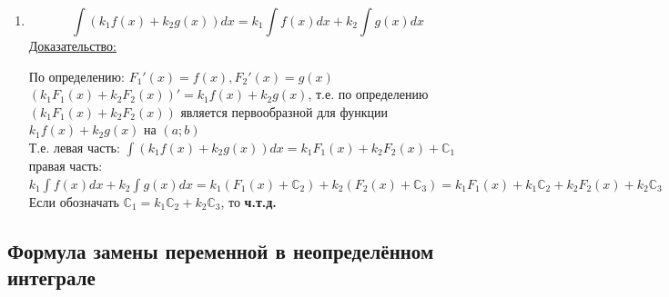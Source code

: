 \documentclass[12pt]{article}
\begin{document}
\begin{enumerate}
\begin{adjustwidth}{1.5em}{1.5em}
            левая часть: $\int (f(x) + g(x))dx = F_1(x) + F_2(x) + \mathbb{C}_1$\\
            правая часть: $\int f(x)dx + \int g(x)dx = F_1(x) + \mathbb{C}_2 + F_2(x) + \mathbb{C}_3$\\
            Если обозначать $C_1 = kC_2$, то \textbf{ч.т.д.}
        \end{adjustwidth}
        \item \[ \int (k_1 f(x) + k_2 g(x))dx = k_1 \int f(x)dx + k_2 \int g(x)dx \]
        \underline{Доказательство:}
        \begin{adjustwidth}{1.5em}{1.5em}
            По определению: $F_1'(x) = f(x), F_2'(x) = g(x)$\\
            $(k_1F_1(x) + k_2F_2(x))' = k_1f(x) + k_2g(x)$, т.е. по определению $(k_1F_1(x) + k_2F_2(x))$ является первообразной для функции $k_1f(x) + k_2g(x)$ на $(a; b)$\\
            Т.е. левая часть: $\int (k_1f(x) + k_2g(x))dx = k_1F_1(x) + k_2F_2(x) + \mathbb{C}_1$\\
            правая часть: $k_1\int f(x)dx + k_2\int g(x)dx = k_1(F_1(x) + \mathbb{C}_2) + k_2(F_2(x) + \mathbb{C}_3) = k_1F_1(x) + k_1\mathbb{C}_2 + k_2F_2(x) + k_2\mathbb{C}_3$\\
            Если обозначать $\mathbb{C}_1 = k_1\mathbb{C}_2 + k_2\mathbb{C}_3$, то \textbf{ч.т.д.}
        \end{adjustwidth}
    \end{enumerate}

    \subsection{Формула замены переменной в неопределённом интеграле}
\end{document}
